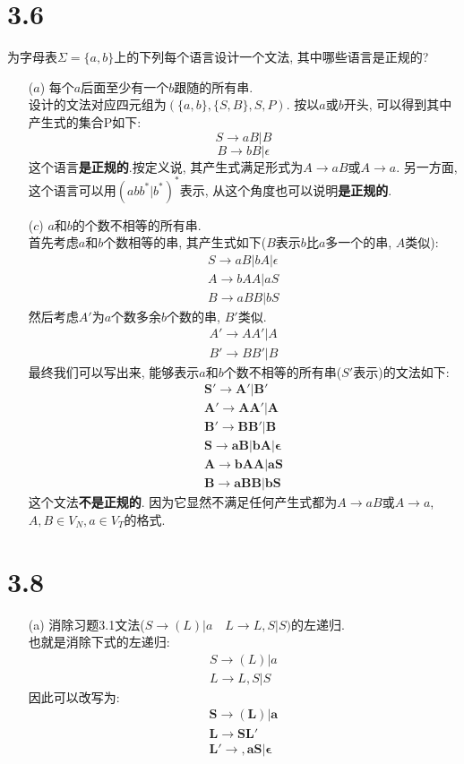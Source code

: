 \documentclass[UTF8]{article}
\begin{document}
\section*{3.6}
\noindent 为字母表$\Sigma=\{a,b\}$上的下列每个语言设计一个文法, 其中哪些语言是正规的?
\begin{enumerate}
\item[($a$) ] 每个$a$后面至少有一个$b$跟随的所有串.\\
	设计的文法对应四元组为$(\{a,b\},\{S,B\}, S, P)$. 按以$a$或$b$开头, 可以得到其中产生式的集合P如下: 
	$$S \rightarrow aB|B$$
	$$B \rightarrow bB|\epsilon$$
	这个语言\textbf{是正规的}.按定义说, 其产生式满足形式为$A\rightarrow aB$或$A\rightarrow a$. 另一方面, 这个语言可以用$(abb^*|b^*)^*$表示, 从这个角度也可以说明\textbf{是正规的}.
\item[($c$) ] {$a$和$b$的个数不相等的所有串.}\\
	首先考虑$a$和$b$个数相等的串, 其产生式如下($B$表示$b$比$a$多一个的串, $A$类似):
	$$\begin{array}{l}
	S\rightarrow aB|bA|\epsilon\\
	A\rightarrow bAA|aS\\
	B\rightarrow aBB|bS
	\end{array}$$
	然后考虑$A'$为$a$个数多余$b$个数的串, $B'$类似.
	$$\begin{array}{l}
	A'\rightarrow AA'|A\\
	B'\rightarrow BB'|B
	\end{array}$$
	最终我们可以写出来, 能够表示$a$和$b$个数不相等的所有串($S'$表示)的文法如下:
	$$\begin{array}{l}
	\bm{S'\rightarrow A'|B'}\\
	\bm{A'\rightarrow AA'|A}\\
	\bm{B'\rightarrow BB'|B}\\
	\bm{S\rightarrow aB|bA|\epsilon}\\
	\bm{A\rightarrow bAA|aS}\\
	\bm{B\rightarrow aBB|bS}
	\end{array}$$
	这个文法\textbf{不是正规的}. 因为它显然不满足任何产生式都为$A\rightarrow aB$或$A\rightarrow a$, $A,B\in V_N,a\in V_T$的格式.
	
\end{enumerate}

\section*{3.8}
\begin{enumerate}
\item[(a) ] 消除习题3.1文法($S\rightarrow (L)|a\quad L\rightarrow L,S|S)$的左递归.\\
	也就是消除下式的左递归:
	$$\begin{array}{l}
	S \rightarrow (L)|a\\
	L\rightarrow L,S|S
	\end{array}$$
	因此可以改写为:
	$$\begin{array}{l}
	\bm{S \rightarrow (L)|a}\\
	\bm{L \rightarrow SL'}\\
	\bm{L' \rightarrow ,aS|\epsilon}
	\end{array}$$
\end{enumerate}
\end{document}
